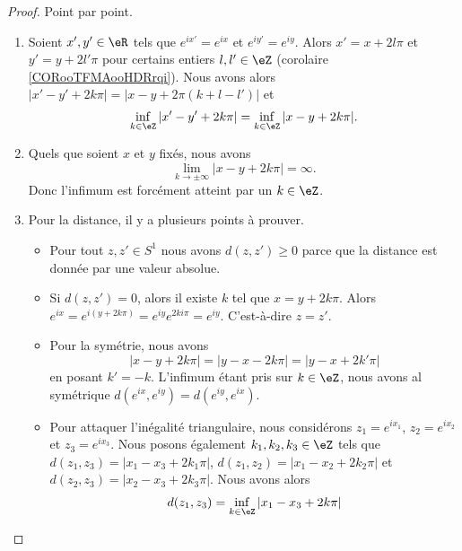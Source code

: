 \begin{proof}
	Point par point.
	\begin{enumerate}
		\item
		      Soient \( x',y'\in \eR\) tels que \(  e^{ix'}= e^{ix}\) et \(  e^{iy'}= e^{iy}\). Alors \( x'=x+2l\pi\) et \( y'=y+2l'\pi\) pour certains entiers \( l,l'\in \eZ\) (corolaire \ref{CORooTFMAooHDRrqi}). Nous avons alors \( | x'-y'+2k\pi |=| x-y+2\pi(k+l-l') |\) et
		      \begin{equation}
			      \inf_{k\in \eZ}| x'-y'+2k\pi |=\inf_{k\in \eZ}| x-y+2k\pi |.
		      \end{equation}
		\item
		      Quels que soient \( x\) et \( y\) fixés, nous avons
		      \begin{equation}
			      \lim_{k\to \pm\infty} | x-y+2k\pi |=\infty.
		      \end{equation}
		      Donc l'infimum est forcément atteint par un \( k\in \eZ\).
		\item
		      Pour la distance, il y a plusieurs points à prouver.
		      \begin{itemize}
			      \item
			            Pour tout \( z,z'\in S^1\) nous avons \( d(z,z')\geq 0\) parce que la distance est donnée par une valeur absolue.
			      \item
			            Si \( d(z,z')=0\), alors il existe \( k\) tel que \( x=y+2k\pi\). Alors \(  e^{ix}= e^{i(y+2k\pi)}= e^{iy} e^{2ki\pi}= e^{iy}\). C'est-à-dire \( z=z'\).
			      \item
			            Pour la symétrie, nous avons
			            \begin{equation}
				            | x-y+2k\pi |=| y-x-2k\pi |=| y-x+2k'\pi |
			            \end{equation}
			            en posant \( k'=-k\). L'infimum étant pris sur \( k\in \eZ\), nous avons al symétrique \( d( e^{ix},  e^{iy})=d( e^{iy}, e^{ix})\).
			      \item
			            Pour attaquer l'inégalité triangulaire, nous considérons \( z_1= e^{ix_1}\), \( z_2= e^{ix_2}\) et \( z_3= e^{ix_3}\). Nous posons également \( k_1,k_2, k_3\in \eZ\) tels que \( d(z_1,z_3)=| x_1-x_3+2k_1\pi | \), \( d(z_1,z_2)=| x_1-x_2+2k_2\pi |\) et \( d(z_2,z_3)=| x_2-x_3+2k_3\pi |\). Nous avons alors
			            \begin{subequations}
				            \begin{align}
					            d(z_1,z_3) & =\inf_{k\in \eZ}| x_1-x_3+2k\pi |                                                               \\

\end{align}
\end{subequations}
\end{itemize}
\end{enumerate}
\end{proof}
